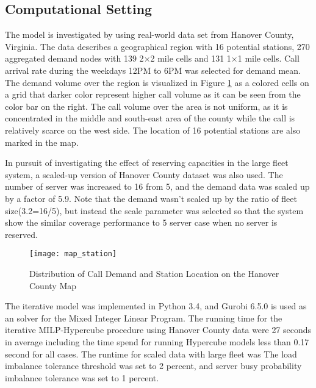 \documentclass{article}
\begin{document}
\subsection{Computational Setting}

The model is investigated by using real-world data set from Hanover County, Virginia. The data describes a geographical region with 16 potential stations, 270 aggregated demand nodes with 139 2$\times $2 mile cells and 131 1$\times $1 mile cells. Call arrival rate during the weekdays 12PM to 6PM was selected for demand mean. The demand volume over the region is visualized in Figure \ref{fig:demand} as a colored cells on a grid that darker color represent higher call volume as it can be seen from the color bar on the right. The call volume over the area is not uniform, as it is concentrated in the middle and south-east area of the county while the call is relatively scarce on the west side. The location of 16 potential stations are also marked in the map.

In pursuit of investigating the effect of reserving capacities in the large fleet system, a scaled-up version of Hanover County dataset was also used. The number of server was increased to 16 from 5, and the demand data was scaled up by a factor of 5.9. Note that the demand wasn't scaled up by the ratio of fleet size(3.2=16/5), but instead the scale parameter was selected so that the system show the similar coverage performance to 5 server case when no server is reserved. 

\begin{figure}
\centering
\texttt{[image: map\_station]}
\caption{Distribution of Call Demand and Station Location on the Hanover County Map}
\label{fig:demand}
\end{figure}

The iterative model was implemented in Python 3.4, and Gurobi 6.5.0 is used as an solver for the Mixed Integer Linear Program. The running time for the iterative MILP-Hypercube procedure using Hanover County data were 27 seconds in average including the time spend for running Hypercube models less than 0.17 second for all cases. The runtime for scaled data with large fleet was  The load imbalance tolerance threshold was set to 2 percent, and server busy probability imbalance tolerance was set to 1 percent.
\end{document}
